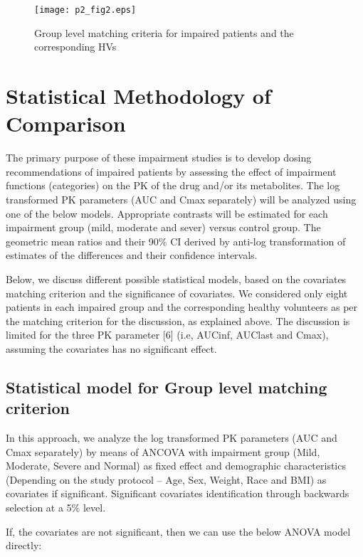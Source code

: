\documentclass[final]{statistica}
\begin{document}
\FloatBarrier
\begin{figure}[h]
	\centering
	\caption{Group level matching criteria for impaired patients and the corresponding HVs}\label{p2_fig2}	
	\texttt{[image: p2\_fig2.eps]}\\
\end{figure}

\section{Statistical Methodology of Comparison}

The primary purpose of these impairment studies is to develop dosing recommendations of impaired patients by assessing the effect of impairment functions (categories) on the PK of the drug and/or its metabolites. The log transformed PK parameters (AUC and Cmax separately) will be analyzed using one of the below models. Appropriate contrasts will be estimated for each impairment group (mild, moderate and sever) versus control group. The geometric mean ratios and their 90\% CI derived by anti-log transformation of estimates of the differences and their confidence intervals.
\vspace{3mm}
\par
Below, we discuss different possible statistical models, based on the covariates matching criterion and the significance of covariates. We considered only eight patients in each impaired group and the corresponding healthy volunteers as per the matching criterion for the discussion, as explained above. The discussion is limited for the three PK parameter [6] (i.e, AUCinf, AUClast and Cmax), assuming the covariates has no significant effect.

\subsection{Statistical model for Group level matching criterion}

In this approach, we analyze the log transformed PK parameters (AUC and Cmax separately) by means of ANCOVA with impairment group (Mild, Moderate, Severe and Normal) as fixed effect and demographic characteristics (Depending on the study protocol – Age, Sex, Weight, Race and BMI) as covariates if significant. Significant covariates identification through backwards selection at a 5\% level.
\vspace{3mm}
\par
If, the covariates are not significant, then we can use the below ANOVA model directly:
\end{document}
